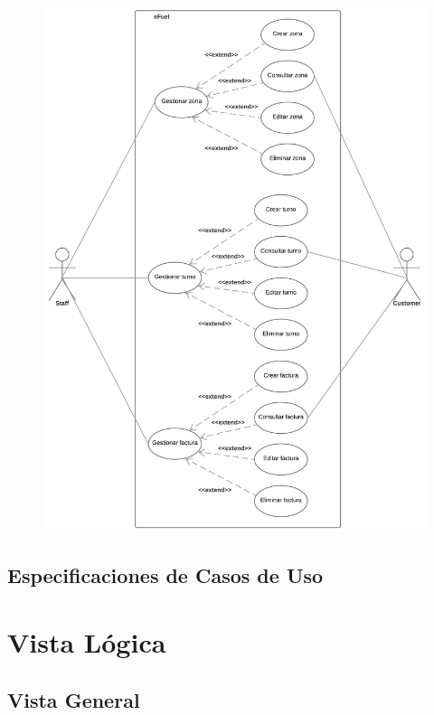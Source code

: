 \documentclass{article}
\begin{document}
    \begin{figure}[H]
        \includegraphics[width=\textwidth]{cu2.jpeg}
        \centering
    \end{figure}


    \subsection{Especificaciones de Casos de Uso}

    \section{Vista Lógica} \label{vistaLogica}
    \subsection{Vista General}
\end{document}

